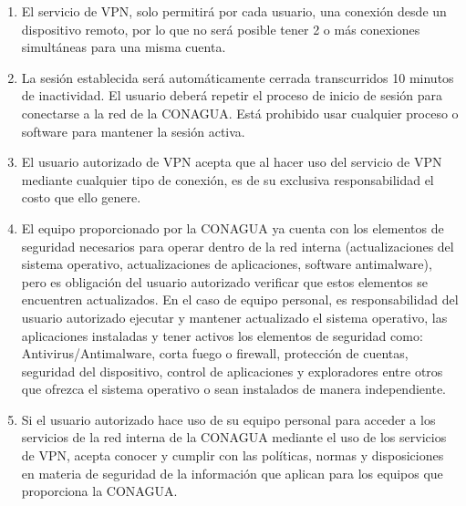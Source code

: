 \documentclass[letterpaper,11pt]{article}
\begin{document}
{\begin{enumerate}
	\item El servicio de VPN, solo permitirá por cada usuario, una conexión desde un dispositivo remoto, por lo que no será posible tener 2 o más conexiones simultáneas para una misma cuenta.
	\item La sesión establecida será automáticamente cerrada transcurridos 10 minutos de inactividad. El usuario deberá repetir el proceso de inicio de sesión para conectarse a la red de la CONAGUA. Está prohibido usar cualquier proceso o software para mantener la sesión activa.
	\item El usuario autorizado de VPN acepta que al hacer uso del servicio de VPN mediante cualquier tipo de conexión, es de su exclusiva responsabilidad el costo que ello genere.
           \item El equipo proporcionado por la CONAGUA ya cuenta con los elementos de seguridad necesarios para operar dentro de la red interna (actualizaciones del sistema operativo, actualizaciones de aplicaciones, software antimalware), pero es obligación del usuario autorizado verificar que estos elementos se encuentren actualizados. En el caso de equipo personal, es responsabilidad del usuario autorizado ejecutar y mantener actualizado el sistema operativo, las aplicaciones instaladas y tener activos los elementos de seguridad como: Antivirus/Antimalware, corta fuego o firewall, protección de cuentas, seguridad del dispositivo, control de aplicaciones y exploradores entre otros que ofrezca el sistema operativo o sean instalados de manera independiente.
            \item Si el usuario autorizado hace uso de su equipo personal para acceder a los servicios de la red interna de la CONAGUA mediante el uso de los servicios de VPN, acepta conocer y cumplir con las políticas, normas y disposiciones en materia de seguridad de la información que aplican para los equipos que proporciona la CONAGUA.

\end{enumerate}}
\end{document}
